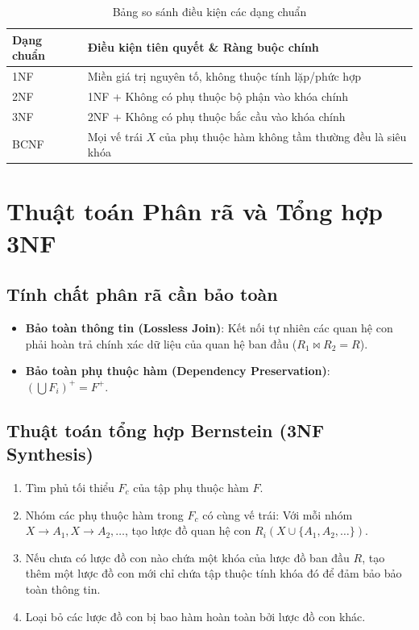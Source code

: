 \begin{table}[H]
\centering
\begin{tabular}{|l|p{10cm}|}
\hline
\textbf{Dạng chuẩn} & \textbf{Điều kiện tiên quyết \& Ràng buộc chính} \\
\hline
1NF & Miền giá trị nguyên tố, không thuộc tính lặp/phức hợp \\
2NF & 1NF + Không có phụ thuộc bộ phận vào khóa chính \\
3NF & 2NF + Không có phụ thuộc bắc cầu vào khóa chính \\
BCNF & Mọi vế trái $X$ của phụ thuộc hàm không tầm thường đều là siêu khóa \\
\hline
\end{tabular}
\caption{Bảng so sánh điều kiện các dạng chuẩn}
\label{tab:so_sanh_dang_chuan}
\end{table}

\section{Thuật toán Phân rã và Tổng hợp 3NF}

\subsection{Tính chất phân rã cần bảo toàn}
\begin{itemize}
    \item \textbf{Bảo toàn thông tin (Lossless Join)}: Kết nối tự nhiên các quan hệ con phải hoàn trả chính xác dữ liệu của quan hệ ban đầu ($R_1 \bowtie R_2 = R$).
    \item \textbf{Bảo toàn phụ thuộc hàm (Dependency Preservation)}: $(\bigcup F_i)^+ = F^+$.
\end{itemize}

\subsection{Thuật toán tổng hợp Bernstein (3NF Synthesis)}
\begin{enumerate}
    \item Tìm phủ tối thiểu $F_c$ của tập phụ thuộc hàm $F$.
    \item Nhóm các phụ thuộc hàm trong $F_c$ có cùng vế trái: Với mỗi nhóm $X \rightarrow A_1, X \rightarrow A_2, \ldots$, tạo lược đồ quan hệ con $R_i(X \cup \{A_1, A_2, \ldots\})$.
    \item Nếu chưa có lược đồ con nào chứa một khóa của lược đồ ban đầu $R$, tạo thêm một lược đồ con mới chỉ chứa tập thuộc tính khóa đó để đảm bảo bảo toàn thông tin.
    \item Loại bỏ các lược đồ con bị bao hàm hoàn toàn bởi lược đồ con khác.
\end{enumerate}
